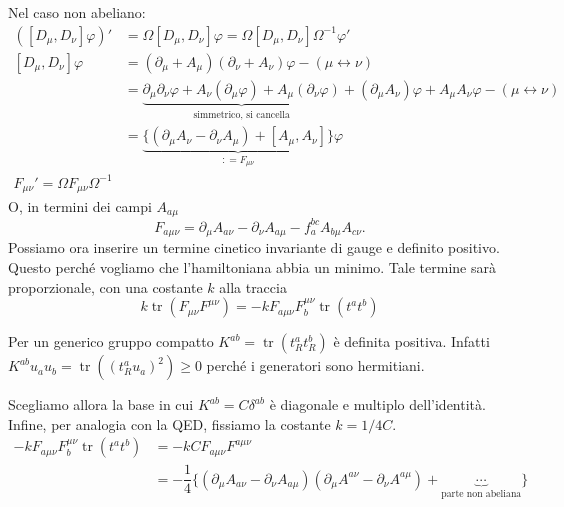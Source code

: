 \documentclass[italian,a4paper]{article}
\theoremstyle{definition}
\DeclareMathOperator{\tr}{tr}
\newcommand{\dimu}{\ensuremath{\partial_{\mu}}}
\newcommand{\Dimu}{\ensuremath{D_{\mu}}}
\newcommand{\dinu}{\ensuremath{\partial_{\nu}}}
\newcommand{\Dinu}{\ensuremath{D_{\nu}}}
\begin{document}
\begin{enumerate}
        Nel caso non abeliano:
        \begin{align*}
            ([\Dimu, \Dinu]\varphi)' &= \Omega [\Dimu, \Dinu]\varphi = \Omega [\Dimu, \Dinu]
            \Omega^{-1}\varphi'\\
            [\Dimu, \Dinu]\varphi &= (\dimu + A_\mu)(\dinu + A_\nu) \varphi -
            (\mu \leftrightarrow \nu)\\
            &= \underbrace{\dimu \dinu \varphi + A_\nu(\dimu \varphi) + A_\mu(\dinu
            \varphi)}_{\text{simmetrico, si cancella}} + (\dimu A_\nu)\varphi + A_\mu
            A_\nu \varphi - (\mu \leftrightarrow \nu)\\
            &= \underbrace{\{ (\dimu A_\nu - \dinu A_\mu) + [A_\mu, A_\nu]
            \}}_{\mathop{:}= F_{\mu\nu}} \varphi\\
            F_{\mu\nu}' = \Omega F_{\mu\nu} \Omega^{-1}
        \end{align*}
        O, in termini dei campi $A_{a\mu}$
        \begin{equation}
            F_{a\mu\nu} = \dimu A_{a\nu} - \dinu A_{a\mu} - f^{bc}_a
            A_{b\mu}A_{c\nu}.
            \label{eq:fmunu}
        \end{equation}
        Possiamo ora inserire un termine cinetico invariante di gauge e
        definito positivo. Questo perch\'e vogliamo che l'hamiltoniana abbia
        un minimo. Tale termine sar\`a proporzionale, con una costante
        $k$ alla traccia
        \begin{equation*}
            k \tr(F_{\mu\nu}F^{\mu\nu}) = -k F_{a\mu\nu}F^{\mu\nu}_b \tr(t^a
            t^b)
        \end{equation*}
        
        Per un generico gruppo compatto $K^{ab} = \tr(t^a_R t^b_R)$
        \`e definita positiva. Infatti $K^{ab}u_a u_b = \tr( (t^a_R u_a)^2)
        \geq 0$ perch\'e i generatori sono hermitiani.

        Scegliamo allora la base in cui $K^{ab} = C\delta^{ab}$ \`e diagonale e multiplo
        dell'identit\`a. Infine, per analogia con la QED, fissiamo la
        costante $k = 1/4C$.
        \begin{align*}
            -k F_{a\mu\nu}F^{\mu\nu}_b \tr(t^a t^b) &= -kC
            F_{a\mu\nu}F^{a\mu\nu}\\
            &= -\dfrac{1}{4}\{ (\dimu A_{a\nu} - \dinu A_{a\mu})
            (\dimu A^{a\nu} - \dinu A^{a\mu}) + \underbrace{\cdots}_{\text{parte non
            abeliana}}\}
        \end{align*}
\end{enumerate}
\end{document}
